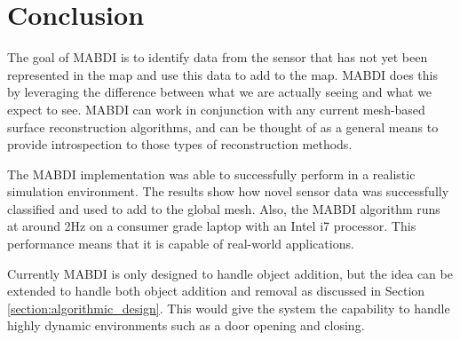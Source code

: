 \chapter{Conclusion} \label{chapter:conclusion}

The goal of MABDI is to identify data from the sensor that has not yet been
represented in the map and use this data to add to the map. MABDI does this by
leveraging the difference between what we are actually seeing and what we expect
to see. MABDI can work in conjunction with any current mesh-based surface
reconstruction algorithms, and can be thought of as a general means to provide
introspection to those types of reconstruction methods.

 The MABDI implementation was able to successfully perform in a realistic
 simulation environment. The results show how novel sensor data was
 successfully classified and used to add to the global mesh. Also, the MABDI
 algorithm runs at around 2Hz on a consumer grade laptop with an Intel i7
 processor. This performance means that it is capable of real-world
 applications.

 Currently MABDI is only designed to handle object addition, but the idea can be
 extended to handle both object addition and removal as discussed in Section
 \ref{section:algorithmic_design}. This would give the system the
 capability to handle highly dynamic environments such as a door opening and
 closing.
